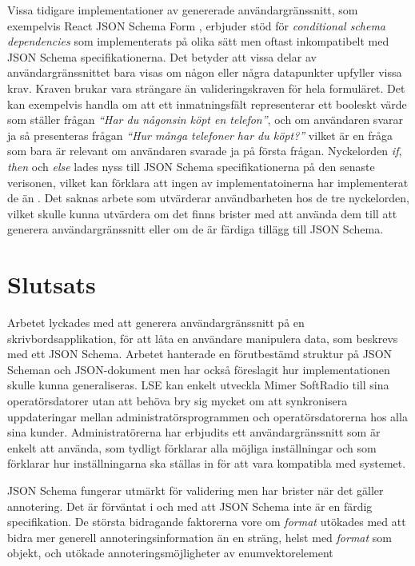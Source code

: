 Vissa tidigare implementationer av genererade användargränssnitt, som exempelvis React JSON Schema Form \cite{MozillaServices}, erbjuder stöd för \textit{conditional schema dependencies} som implementerats på olika sätt men oftast inkompatibelt med JSON Schema specifikationerna. Det betyder att vissa delar av användargränssnittet bara visas om någon eller några datapunkter upfyller vissa krav. Kraven brukar vara strängare än valideringskraven för hela formuläret. Det kan exempelvis handla om att ett inmatningsfält representerar ett booleskt värde som ställer frågan \textit{``Har du någonsin köpt en telefon''}, och om användaren svarar ja så presenteras frågan \textit{``Hur många telefoner har du köpt?''} vilket är en fråga som bara är relevant om användaren svarade ja på första frågan. Nyckelorden \textit{if}, \textit{then} och \textit{else} lades nyss till JSON Schema specifikationerna på den senaste verisonen, vilket kan förklara att ingen av implementatoinerna har implementerat de än \cite{Andrews2018}. Det saknas arbete som utvärderar användbarheten hos de tre nyckelorden, vilket skulle kunna utvärdera om det finns brister med att använda dem till att generera användargränssnitt eller om de är färdiga tillägg till JSON Schema.

\section{Slutsats}

Arbetet lyckades med att generera användargränssnitt på en skrivbordsapplikation, för att låta en användare manipulera data, som beskrevs med ett JSON Schema. Arbetet hanterade en förutbestämd struktur på JSON Scheman och JSON-dokument men har också föreslagit hur implementationen skulle kunna generaliseras. LSE kan enkelt utveckla Mimer SoftRadio till sina operatörsdatorer utan att behöva bry sig mycket om att synkronisera uppdateringar mellan administratörsprogrammen och operatörsdatorerna hos alla sina kunder. Administratörerna har erbjudits ett användargränssnitt som är enkelt att använda, som tydligt förklarar alla möjliga inställningar och som förklarar hur inställningarna ska ställas in för att vara kompatibla med systemet.

JSON Schema fungerar utmärkt för validering men har brister när det gäller annotering. Det är förväntat i och med att JSON Schema inte är en färdig specifikation. De största bidragande faktorerna vore om \textit{format} utökades med att bidra mer generell annoteringsinformation än en sträng, helst med \textit{format} som objekt, och utökade annoteringsmöjligheter av enumvektorelement